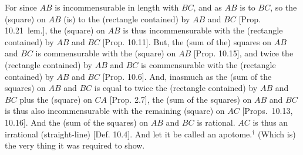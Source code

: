 \begin{Parallel}{}{}
{For since $AB$ is incommensurable in length with $BC$, and as $AB$ is to
$BC$, so the (square) on $AB$ (is) to the (rectangle contained) by $AB$ and
$BC$ [Prop. 10.21~lem.], the
(square) on $AB$ is thus incommensurable with the (rectangle contained)
by $AB$ and $BC$ [Prop. 10.11]. 
But, the (sum of the) squares on $AB$ and $BC$ is commensurable with the
(square) on $AB$ [Prop. 10.15], and twice
the (rectangle contained) by $AB$ and $BC$ is commensurable with the
(rectangle contained) by $AB$ and $BC$ [Prop. 10.6]. And, inasmuch as the (sum of the squares) on $AB$ and $BC$ is equal to twice the (rectangle contained) by
$AB$ and $BC$ plus the (square) on $CA$ [Prop. 2.7], the (sum of the squares) on $AB$ and $BC$
is thus also incommensurable with the remaining (square) on $AC$ [Props.~10.13, 10.16]. 
And the (sum of the squares) on $AB$ and $BC$ is rational. $AC$ is
thus an irrational (straight-line) [Def. 10.4]. And let it be called an
apotome.$^\dag$ (Which is) the very thing it was required to show.}
\end{Parallel}


\vspace{7pt}{\footnotesize\noindent $^\dag$ See footnote to Prop.~10.36.}

